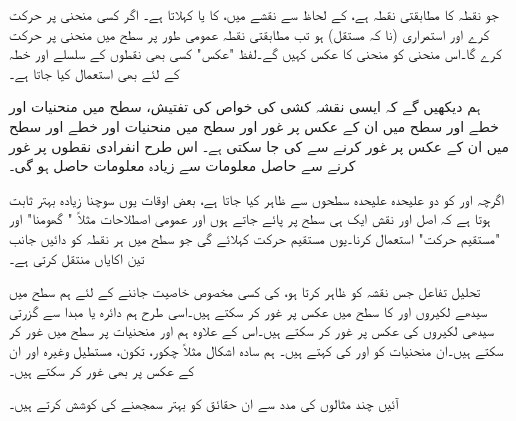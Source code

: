  جو نقطہ  کا مطابقتی نقطہ ہے،   کے لحاظ سے نقشے میں،  کا   یا  کہلاتا ہے۔ اگر  کسی منحنی پر حرکت کرے اور  استمراری (نا کہ مستقل)  ہو تب مطابقتی نقطہ  عمومی طور پر سطح  میں منحنی  پر حرکت کرے گا۔اس منحنی کو منحنی  کا عکس کہیں گے۔لفظ "عکس" کسی بھی نقطوں کے سلسلے اور خطہ کے لئے بھی استعمال کیا جاتا ہے۔ 

ہم دیکھیں گے کہ ایسی نقشہ کشی کی خواص کی تفتیش،   سطح میں منحنیات اور خطے اور   سطح میں ان کے عکس پر غور اور  سطح میں منحنیات اور خطے اور   سطح میں ان کے عکس پر غور  کرنے سے  کی جا سکتی ہے۔ اس طرح  انفرادی نقطوں پر غور کرنے سے حاصل معلومات سے  زیادہ معلومات حاصل ہو گی۔

اگرچہ   اور  کو دو علیحدہ علیحدہ سطحوں سے ظاہر کیا جاتا ہے، بعض اوقات یوں  سوچنا زیادہ بہتر ثابت ہوتا ہے  کہ اصل اور نقش ایک ہی سطح پر پائے جاتے ہوں اور  عمومی اصطلاحات مثلاً " گھومنا" اور "مستقیم حرکت" استعمال کرنا۔یوں    مستقیم حرکت کہلائے گی جو  سطح میں ہر نقطہ کو دائیں جانب تین اکایاں منتقل کرتی ہے۔

تحلیل تفاعل  جس نقشہ کو ظاہر کرتا ہو، کی کسی مخصوص  خاصیت  جاننے کے لئے ہم  سطح میں سیدھے لکیروں  اور  کا  سطح میں عکس پر غور کر سکتے ہیں۔اسی طرح ہم دائرہ  یا مبدا سے گزرتی سیدھی لکیروں کی عکس پر غور کر سکتے ہیں۔اس کے علاوہ ہم  اور  منحنیات پر  سطح میں غور کر سکتے ہیں۔ان منحنیات کو  اور  کی  کہتے ہیں۔ ہم سادہ اشکال مثلاً چکور، تکون، مستطیل وغیرہ اور ان کے عکس پر بھی غور کر سکتے ہیں۔

آئیں چند مثالوں کی مدد سے ان حقائق کو بہتر سمجھنے کی کوشش کرتے ہیں۔

